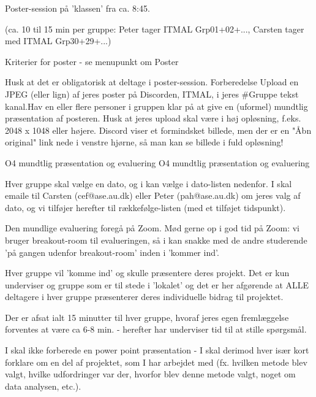     Poster-session på 'klassen'  fra ca. 8:45.

    (ca. 10 til 15 min per gruppe: Peter tager ITMAL Grp01+02+..., Carsten tager med ITMAL Grp30+29+...)

    Kriterier for poster - se menupunkt om Poster 

    Husk at det er obligatorisk at deltage i poster-session.
    Forberedelse
        Upload en JPEG (eller lign) af jeres poster på Discorden, ITMAL, i jeres #Gruppe tekst kanal.Hav en eller flere personer i gruppen klar på at give en (uformel) mundtlig præsentation af posteren.
            Husk at jeres upload skal være i høj opløsning, f.eks. 2048 x 1048 eller højere.
            Discord viser et formindsket billede, men der er en "Åbn original" link nede i venstre hjørne, så man kan se billede i fuld opløsning!

























O4 mundtlig præsentation og evaluering
O4 mundtlig præsentation og evaluering

Hver gruppe skal vælge en dato, og i kan vælge i dato-listen nedenfor. I skal emaile til Carsten (cef@ase.au.dk) eller Peter  (pah@ase.au.dk) om jeres valg af dato, og vi tilføjer herefter til rækkefølge-listen (med et tilføjet tidspunkt).

Den mundlige evaluering foregå på Zoom. Mød gerne op i god tid på Zoom: vi bruger breakout-room til evalueringen, så i kan snakke med de andre studerende 'på gangen udenfor breakout-room' inden i 'kommer ind'.

Hver gruppe vil 'komme ind' og skulle præsentere deres projekt. Det er kun underviser og gruppe som er til stede i 'lokalet' og det er her afgørende at ALLE deltagere i hver gruppe præsenterer deres individuelle bidrag til projektet.

Der er afsat ialt 15 minutter til hver gruppe, hvoraf jeres egen fremlæggelse forventes at være ca 6-8 min. - herefter har underviser tid til at stille spørgsmål. 

I skal ikke forberede en power point præsentation - I skal derimod hver især kort forklare om en del af projektet, som I har arbejdet med (fx. hvilken metode blev valgt, hvilke udfordringer var der, hvorfor blev denne metode valgt, noget om data analysen, etc.).

